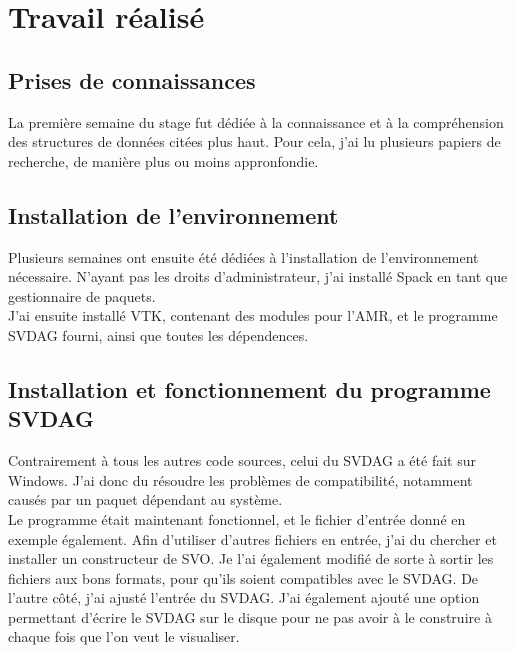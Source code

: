 \documentclass[12pt,a4paper,twoside]{article}
\begin{document}
    \begin{figure}[H]
    \end{figure}

    \begin{figure}[H]
    \end{figure}

\section{Travail réalisé}

    \subsection{Prises de connaissances}

    La première semaine du stage fut dédiée à la connaissance et à la compréhension des structures de données citées plus haut.
    Pour cela, j'ai lu plusieurs papiers de recherche, de manière plus ou moins appronfondie.

    \subsection{Installation de l'environnement}

    Plusieurs semaines ont ensuite été dédiées à l'installation de l'environnement nécessaire.
    N'ayant pas les droits d'administrateur, j'ai installé Spack en tant que gestionnaire de paquets.\\
    J'ai ensuite installé VTK, contenant des modules pour l'AMR, et le programme SVDAG fourni, ainsi que toutes les dépendences.

    \subsection{Installation et fonctionnement du programme SVDAG}

    Contrairement à tous les autres code sources, celui du SVDAG a été fait sur Windows. J'ai donc du résoudre les problèmes
    de compatibilité, notamment causés par un paquet dépendant au système. \\
    Le programme était maintenant fonctionnel, et le fichier d'entrée donné en exemple également.
    Afin d'utiliser d'autres fichiers en entrée, j'ai du chercher et installer un constructeur de SVO. Je l'ai également
    modifié de sorte à sortir les fichiers aux bons formats, pour qu'ils soient compatibles avec le SVDAG.
    De l'autre côté, j'ai ajusté l'entrée du SVDAG. J'ai également ajouté une option permettant d'écrire le SVDAG sur
    le disque pour ne pas avoir à le construire à chaque fois que l'on veut le visualiser.
\end{document}
